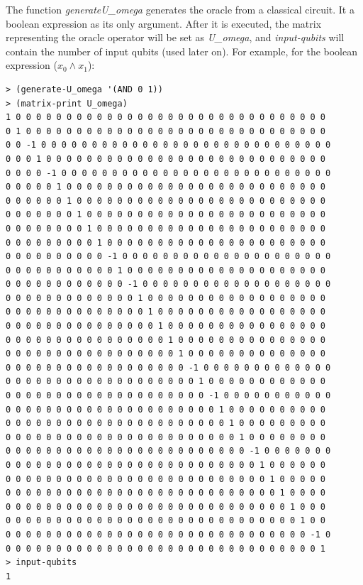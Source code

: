 \documentclass[11pt]{report}
\newcommand{\?}{\stackrel{?}{=}}
\begin{document}
The function \textit{generate\-U\_omega} generates the oracle from a classical circuit. It a boolean expression as its only argument. After it is executed, the matrix representing the oracle operator will be set as \textit{U\_omega}, and \textit{input-qubits} will contain the number of input qubits (used later on). For example, for the boolean expression ($x_0 \land x_1$):

\begin{lstlisting}
> (generate-U_omega '(AND 0 1))
> (matrix-print U_omega)
1 0 0 0 0 0 0 0 0 0 0 0 0 0 0 0 0 0 0 0 0 0 0 0 0 0 0 0 0 0 0 0 
0 1 0 0 0 0 0 0 0 0 0 0 0 0 0 0 0 0 0 0 0 0 0 0 0 0 0 0 0 0 0 0 
0 0 -1 0 0 0 0 0 0 0 0 0 0 0 0 0 0 0 0 0 0 0 0 0 0 0 0 0 0 0 0 0 
0 0 0 1 0 0 0 0 0 0 0 0 0 0 0 0 0 0 0 0 0 0 0 0 0 0 0 0 0 0 0 0 
0 0 0 0 -1 0 0 0 0 0 0 0 0 0 0 0 0 0 0 0 0 0 0 0 0 0 0 0 0 0 0 0 
0 0 0 0 0 1 0 0 0 0 0 0 0 0 0 0 0 0 0 0 0 0 0 0 0 0 0 0 0 0 0 0 
0 0 0 0 0 0 1 0 0 0 0 0 0 0 0 0 0 0 0 0 0 0 0 0 0 0 0 0 0 0 0 0 
0 0 0 0 0 0 0 1 0 0 0 0 0 0 0 0 0 0 0 0 0 0 0 0 0 0 0 0 0 0 0 0 
0 0 0 0 0 0 0 0 1 0 0 0 0 0 0 0 0 0 0 0 0 0 0 0 0 0 0 0 0 0 0 0 
0 0 0 0 0 0 0 0 0 1 0 0 0 0 0 0 0 0 0 0 0 0 0 0 0 0 0 0 0 0 0 0 
0 0 0 0 0 0 0 0 0 0 -1 0 0 0 0 0 0 0 0 0 0 0 0 0 0 0 0 0 0 0 0 0 
0 0 0 0 0 0 0 0 0 0 0 1 0 0 0 0 0 0 0 0 0 0 0 0 0 0 0 0 0 0 0 0 
0 0 0 0 0 0 0 0 0 0 0 0 -1 0 0 0 0 0 0 0 0 0 0 0 0 0 0 0 0 0 0 0 
0 0 0 0 0 0 0 0 0 0 0 0 0 1 0 0 0 0 0 0 0 0 0 0 0 0 0 0 0 0 0 0 
0 0 0 0 0 0 0 0 0 0 0 0 0 0 1 0 0 0 0 0 0 0 0 0 0 0 0 0 0 0 0 0 
0 0 0 0 0 0 0 0 0 0 0 0 0 0 0 1 0 0 0 0 0 0 0 0 0 0 0 0 0 0 0 0 
0 0 0 0 0 0 0 0 0 0 0 0 0 0 0 0 1 0 0 0 0 0 0 0 0 0 0 0 0 0 0 0 
0 0 0 0 0 0 0 0 0 0 0 0 0 0 0 0 0 1 0 0 0 0 0 0 0 0 0 0 0 0 0 0 
0 0 0 0 0 0 0 0 0 0 0 0 0 0 0 0 0 0 -1 0 0 0 0 0 0 0 0 0 0 0 0 0 
0 0 0 0 0 0 0 0 0 0 0 0 0 0 0 0 0 0 0 1 0 0 0 0 0 0 0 0 0 0 0 0 
0 0 0 0 0 0 0 0 0 0 0 0 0 0 0 0 0 0 0 0 -1 0 0 0 0 0 0 0 0 0 0 0 
0 0 0 0 0 0 0 0 0 0 0 0 0 0 0 0 0 0 0 0 0 1 0 0 0 0 0 0 0 0 0 0 
0 0 0 0 0 0 0 0 0 0 0 0 0 0 0 0 0 0 0 0 0 0 1 0 0 0 0 0 0 0 0 0 
0 0 0 0 0 0 0 0 0 0 0 0 0 0 0 0 0 0 0 0 0 0 0 1 0 0 0 0 0 0 0 0 
0 0 0 0 0 0 0 0 0 0 0 0 0 0 0 0 0 0 0 0 0 0 0 0 -1 0 0 0 0 0 0 0 
0 0 0 0 0 0 0 0 0 0 0 0 0 0 0 0 0 0 0 0 0 0 0 0 0 1 0 0 0 0 0 0 
0 0 0 0 0 0 0 0 0 0 0 0 0 0 0 0 0 0 0 0 0 0 0 0 0 0 1 0 0 0 0 0 
0 0 0 0 0 0 0 0 0 0 0 0 0 0 0 0 0 0 0 0 0 0 0 0 0 0 0 1 0 0 0 0 
0 0 0 0 0 0 0 0 0 0 0 0 0 0 0 0 0 0 0 0 0 0 0 0 0 0 0 0 1 0 0 0 
0 0 0 0 0 0 0 0 0 0 0 0 0 0 0 0 0 0 0 0 0 0 0 0 0 0 0 0 0 1 0 0 
0 0 0 0 0 0 0 0 0 0 0 0 0 0 0 0 0 0 0 0 0 0 0 0 0 0 0 0 0 0 -1 0 
0 0 0 0 0 0 0 0 0 0 0 0 0 0 0 0 0 0 0 0 0 0 0 0 0 0 0 0 0 0 0 1 
> input-qubits
1
\end{lstlisting}
\end{document}
